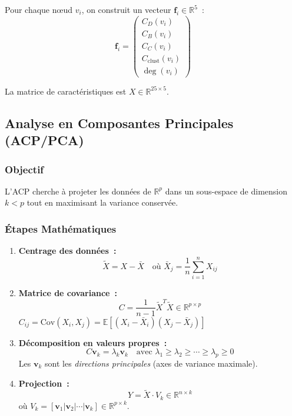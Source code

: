 \documentclass[12pt,a4paper]{article}
\begin{document}
Pour chaque n\oe{}ud $v_i$, on construit un vecteur $\mathbf{f}_i \in \mathbb{R}^5$~:
\[
    \mathbf{f}_i = \begin{pmatrix}
        C_D(v_i) \\
        C_B(v_i) \\
        C_C(v_i) \\
        C_{\text{clust}}(v_i) \\
        \deg(v_i)
    \end{pmatrix}
\]

La matrice de caractéristiques est $X \in \mathbb{R}^{25 \times 5}$.

\subsection{Analyse en Composantes Principales (ACP/PCA)}

\subsubsection{Objectif}

L'ACP cherche à projeter les données de $\mathbb{R}^p$ dans un sous-espace de dimension $k < p$ tout en maximisant la variance conservée.

\subsubsection{Étapes Mathématiques}

\begin{enumerate}
    \item \textbf{Centrage des données~:}
    \[
        \tilde{X} = X - \bar{X} \quad \text{où } \bar{X}_j = \frac{1}{n} \sum_{i=1}^{n} X_{ij}
    \]

    \item \textbf{Matrice de covariance~:}
    \[
        C = \frac{1}{n-1} \tilde{X}^T \tilde{X} \in \mathbb{R}^{p \times p}
    \]
    $C_{ij} = \text{Cov}(X_i, X_j) = \mathbb{E}[(X_i - \bar{X}_i)(X_j - \bar{X}_j)]$

    \item \textbf{Décomposition en valeurs propres~:}
    \[
        C \mathbf{v}_k = \lambda_k \mathbf{v}_k \quad \text{avec } \lambda_1 \geq \lambda_2 \geq \cdots \geq \lambda_p \geq 0
    \]
    Les $\mathbf{v}_k$ sont les \emph{directions principales} (axes de variance maximale).

    \item \textbf{Projection~:}
    \[
        Y = \tilde{X} \cdot V_k \in \mathbb{R}^{n \times k}
    \]
    où $V_k = [\mathbf{v}_1 | \mathbf{v}_2 | \cdots | \mathbf{v}_k] \in \mathbb{R}^{p \times k}$.
\end{enumerate}
\end{document}
